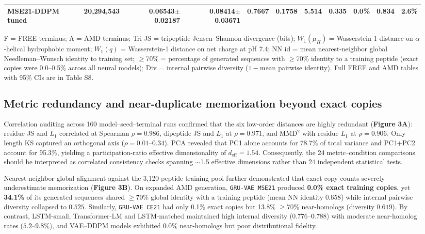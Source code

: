 \documentclass[unnumsec,webpdf,contemporary,large]{oup-authoring-template}
\newcommand{\rev}[1]{#1}
\begin{document}
\begin{table}[t]
\begin{tabular}{lrrrrrrrrrr}
\rev{MSE21-DDPM tuned} & \rev{20,294,543} & \rev{0.06543$\pm$0.02187} & \rev{0.08414$\pm$0.03671} & \rev{0.7667} & \rev{0.1758} & \rev{5.514} & \rev{0.335} & \rev{0.0\%} & \rev{0.834} & \rev{2.6\%} \\
\bottomrule
\end{tabular}
\par\smallskip
\begin{minipage}{0.96\textwidth}\footnotesize
\rev{F = FREE terminus; A = AMD terminus; Tri JS = tripeptide Jensen--Shannon divergence (bits); $W_1(\mu_H)$ = Wasserstein-1 distance on $\alpha$-helical hydrophobic moment; $W_1(q)$ = Wasserstein-1 distance on net charge at pH 7.4; NN id = mean nearest-neighbor global Needleman--Wunsch identity to training set; $\geq$70\% = percentage of generated sequences with $\geq$70\% identity to a training peptide (exact copies were 0.0--0.5\% across all neural models); Div = internal pairwise diversity ($1-$mean pairwise identity). Full FREE and AMD tables with 95\% CIs are in Table S8.}
\end{minipage}
\end{table}

\subsection{Metric redundancy and near-duplicate memorization beyond exact copies}

\rev{Correlation auditing across 160 model--seed--terminal runs confirmed that the six low-order distances are highly redundant (\textbf{Figure 3A}): residue JS and $L_1$ correlated at Spearman $\rho=0.986$, dipeptide JS and $L_1$ at $\rho=0.971$, and MMD$^2$ with residue $L_1$ at $\rho=0.906$. Only length KS captured an orthogonal axis ($\rho=0.01\text{--}0.34$). PCA revealed that PC1 alone accounts for 78.7\% of total variance and PC1+PC2 account for 95.3\%, yielding a participation-ratio effective dimensionality of $d_{\mathrm{eff}}=1.54$. Consequently, the 24 metric--condition comparisons should be interpreted as correlated consistency checks spanning $\sim$1.5 effective dimensions rather than 24 independent statistical tests.}

\rev{Nearest-neighbor global alignment against the 3,120-peptide training pool further demonstrated that exact-copy counts severely underestimate memorization (\textbf{Figure 3B}). On expanded AMD generation, \texttt{GRU-VAE MSE21} produced \textbf{0.0\% exact training copies}, yet \textbf{34.1\%} of its generated sequences shared $\geq$70\% global identity with a training peptide (mean NN identity $0.658$) while internal pairwise diversity collapsed to $0.525$. Similarly, \texttt{GRU-VAE CE21} had only 0.1\% exact copies but 13.8\% $\geq$70\% near-homologs (diversity $0.619$). By contrast, LSTM-small, Transformer-LM and LSTM-matched maintained high internal diversity ($0.776\text{--}0.788$) with moderate near-homolog rates ($5.2\text{--}9.8\%$), and VAE--DDPM models exhibited 0.0\% near-homologs but poor distributional fidelity.}
\end{document}
